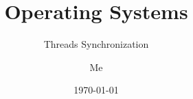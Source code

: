 \documentclass[12pt]{beamer}
\title{Operating Systems}
\subtitle{Threads Synchronization}
\author{Me}
\date{\today}
\begin{document}
  \begin{frame}
    \titlepage
  \end{frame}

  
  
  

%    
\end{document}
